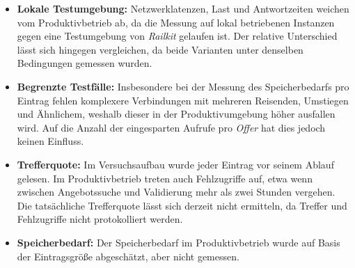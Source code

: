 \begin{itemize}
    \item \textbf{Lokale Testumgebung:} Netzwerklatenzen, Last und Antwortzeiten weichen vom Produktivbetrieb ab, da die Messung auf lokal betriebenen Instanzen gegen eine Testumgebung von \textit{Railkit} gelaufen ist. Der relative Unterschied lässt sich hingegen vergleichen, da beide Varianten unter denselben Bedingungen gemessen wurden.
    \item \textbf{Begrenzte Testfälle:} Insbesondere bei der Messung des Speicherbedarfs pro Eintrag fehlen komplexere Verbindungen mit mehreren Reisenden, Umstiegen und Ähnlichem, weshalb dieser in der Produktivumgebung höher ausfallen wird. Auf die Anzahl der eingesparten Aufrufe pro \textit{Offer} hat dies jedoch keinen Einfluss.
    \item \textbf{Trefferquote:} Im Versuchsaufbau wurde jeder Eintrag vor seinem Ablauf gelesen. Im Produktivbetrieb treten auch Fehlzugriffe auf, etwa wenn zwischen Angebotssuche und Validierung mehr als zwei Stunden vergehen. Die tatsächliche Trefferquote lässt sich derzeit nicht ermitteln, da Treffer und Fehlzugriffe nicht protokolliert werden.
    \item \textbf{Speicherbedarf:} Der Speicherbedarf im Produktivbetrieb wurde auf Basis der Eintragsgröße abgeschätzt, aber nicht gemessen.
\end{itemize}